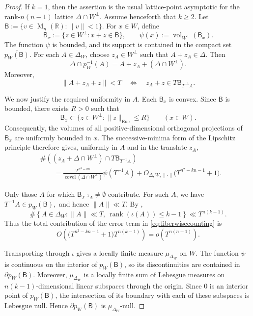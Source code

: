 \documentclass[reqno,11pt]{amsart}
\numberwithin{equation}{section}
\theoremstyle{definition}
\theoremstyle{remark}
\newcommand{\op}{\operatorname}
\newcommand{\rank}{\op{rank}}
\newcommand{\M}{\op{M}}
\begin{document}
\begin{proof}
If $k=1$, then the assertion is
the usual lattice-point asymptotic for the rank-$n(n-1)$ lattice
$\Delta\cap W^\perp$. Assume henceforth that $k\ge2$.
Let
$\mathsf B:=\{v\in\M_n(\mathbb R):\|v\|<1\}.$
For $x\in W$, define
$$
\mathsf B_x
:=
\{z\in W^\perp:x+z\in\mathsf B\},
\qquad
\psi(x)
:=
\operatorname{vol}_{W^\perp}(\mathsf B_x).
$$
The function $\psi$ is bounded, and its support is contained in the
compact set $\overline{p_W(\mathsf B)}$. For each $A\in\Delta_W$, choose $z_A\in W^\perp$ such that
$A+z_A\in\Delta$. Then
$$
\Delta\cap p_W^{-1}(A)
=
A+z_A+(\Delta\cap W^\perp).
$$
Moreover,
$$
\|A+z_A+z\|<T
\quad\Longleftrightarrow\quad
z_A+z\in T\mathsf B_{T^{-1}A}.
$$

We now justify the required uniformity in $A$. Each
$\mathsf B_x$ is convex. Since $\mathsf B$ is bounded, there exists
$R>0$ such that
$$
\mathsf B_x
\subset
\{z\in W^\perp:\|z\|_{\mathrm{Euc}}\le R\}
\qquad(x\in W).
$$
Consequently, the volumes of all positive-dimensional orthogonal
projections of $\mathsf B_x$ are uniformly bounded in $x$. The
successive-minima form of the Lipschitz principle therefore gives,
uniformly in $A$ and in the translate $z_A$,
\begin{equation}\label{eq:fiberwisecounting}
\begin{aligned}
&\#\left(
(z_A+\Delta\cap W^\perp)
\cap T\mathsf B_{T^{-1}A}
\right)\\
&\qquad=
\frac{T^{n^2-kn}}
{\operatorname{covol}(\Delta\cap W^\perp)}
\psi(T^{-1}A)
+
O_{\Delta,W,\|\cdot\|}
\bigl(T^{n^2-kn-1}+1\bigr).
\end{aligned}
\end{equation}

Only those $A$ for which
$\mathsf B_{T^{-1}A}\ne\emptyset$ contribute. For such $A$,
we have $
T^{-1}A\in p_W(\mathsf B),
$
and hence $\|A\|\ll T$. By ,
$$
\#\left\{
A\in\Delta_W:\|A\|\ll T,\
\rank(\iota(A))\le k-1
\right\}
\ll T^{n(k-1)}.
$$
Thus the total contribution of the error term in
\eqref{eq:fiberwisecounting} is
$$
O\left(
\bigl(T^{n^2-kn-1}+1\bigr)T^{n(k-1)}
\right)
=
o(T^{n(n-1)}).
$$

Transporting  through $\iota$ gives a
locally finite measure $\mu_{\Delta_W}$ on $W$. The function $\psi$ is
continuous on the interior of $p_W(\mathsf B)$, so its discontinuities
are contained in $\partial p_W(\mathsf B)$. Moreover,
$\mu_{\Delta_W}$ is a locally finite sum of Lebesgue measures on
$n(k-1)$-dimensional linear subspaces through the origin. Since $0$ is
an interior point of $p_W(\mathsf B)$, the intersection of its boundary
with each of these subspaces is Lebesgue null. Hence
$\partial p_W(\mathsf B)$ is $\mu_{\Delta_W}$-null.


\end{proof}
\end{document}
